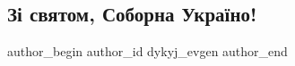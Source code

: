  
 
 
 
 
 
\subsection{Зі святом, Соборна Україно!}
\label{sec:22_01_2022.fb.dykyj_evgen.1.zi_svjatom_soborna_ukraina}
 
\ifcmt
 author_begin
   author_id dykyj_evgen
 author_end
\fi

